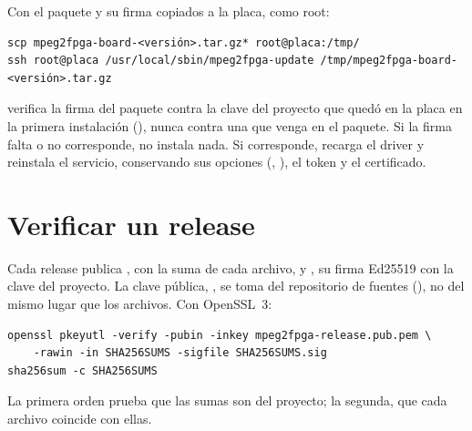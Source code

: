 Con el paquete y su firma copiados a la placa, como root:

\begin{lstlisting}[language=shell]
scp mpeg2fpga-board-<versión>.tar.gz* root@placa:/tmp/
ssh root@placa /usr/local/sbin/mpeg2fpga-update /tmp/mpeg2fpga-board-<versión>.tar.gz
\end{lstlisting}

 verifica la firma del paquete contra la clave del
proyecto que quedó en la placa en la primera instalación
(), nunca contra una que venga en el
paquete. Si la firma falta o no corresponde, no instala nada. Si corresponde,
recarga el driver y reinstala el servicio, conservando sus opciones
(, ), el token y el certificado.

\section{Verificar un release}
\label{sec:verificar}

Cada release publica , con la suma de cada archivo, y
, su firma Ed25519 con la clave del proyecto. La clave
pública, , se toma del repositorio de fuentes
(), no del mismo lugar que los archivos. Con OpenSSL~3:

\begin{lstlisting}[language=shell]
openssl pkeyutl -verify -pubin -inkey mpeg2fpga-release.pub.pem \
    -rawin -in SHA256SUMS -sigfile SHA256SUMS.sig
sha256sum -c SHA256SUMS
\end{lstlisting}

La primera orden prueba que las sumas son del proyecto; la segunda, que cada
archivo coincide con ellas.
